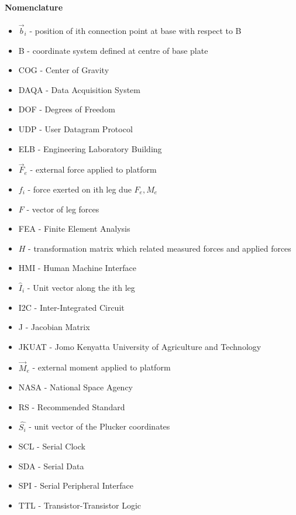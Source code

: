 \paragraph{Nomenclature}
\begin{itemize}
\item $\vec{b}_i$ - position of ith connection point at base with respect to B
\item B - coordinate system defined at centre of base plate
\item COG - Center of Gravity
\item DAQA - Data Acquisition System
\item DOF - Degrees of Freedom
\item UDP - User Datagram Protocol
\item ELB - Engineering Laboratory Building
\item $\vec{F}_e$ - external force applied to platform
\item $f_i$ - force exerted on ith leg due $F_e, M_e$
\item $F$ - vector of leg forces
\item FEA - Finite Element Analysis
\item $H$ - transformation matrix which related measured forces and applied forces
\item HMI - Human Machine Interface
\item $\hat{I}_i$ - Unit vector along the ith leg 
\item I2C - Inter-Integrated Circuit 
\item J - Jacobian Matrix 
\item JKUAT - Jomo Kenyatta University of Agriculture and Technology
\item $\vec{M}_e$ - external moment applied to platform
\item NASA - National Space Agency
\item RS - Recommended Standard
\item $\hat{{S_{i}}}$ - unit vector of the Plucker coordinates
\item SCL - Serial Clock
\item SDA - Serial Data
\item SPI - Serial Peripheral Interface
\item TTL - Transistor-Transistor Logic
\end{itemize}
\pagebreak